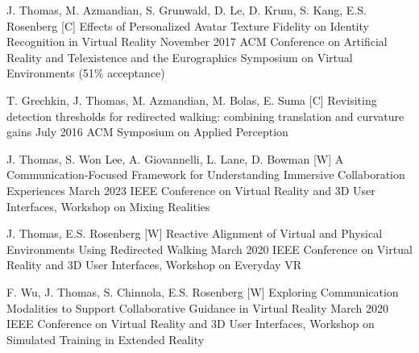 \begin{cvpubs}
  \cvpub
    {J. Thomas, M. Azmandian, S. Grunwald, D. Le, D. Krum, S. Kang, E.S. Rosenberg} %
    {[C\thenpubs] Effects of Personalized Avatar Texture Fidelity on Identity Recognition in Virtual Reality} %
    {November 2017} %
    {ACM Conference on Artificial Reality and Telexistence and the Eurographics Symposium on Virtual Environments (51\% acceptance)} %
    
  \cvpub
    {T. Grechkin, J. Thomas, M. Azmandian, M. Bolas, E. Suma} %
    {[C\thenpubs] Revisiting detection thresholds for redirected walking: combining translation and curvature gains} %
    {July 2016} %
    {ACM Symposium on Applied Perception} %
\end{cvpubs}
   
\setcounter{npubs}{1}
\begin{cvpubs}  
  
  \cvpub
    {J. Thomas, S. Won Lee, A. Giovannelli, L. Lane, D. Bowman} %
    {[W\thenpubs] A Communication-Focused Framework for Understanding Immersive Collaboration Experiences} %
    {March 2023} %
    {IEEE Conference on Virtual Reality and 3D User Interfaces, Workshop on Mixing Realities} %
  
  \cvpub
    {J. Thomas, E.S. Rosenberg} %
    {[W\thenpubs] Reactive Alignment of Virtual and Physical Environments Using Redirected Walking} %
    {March 2020} %
    {IEEE Conference on Virtual Reality and 3D User Interfaces, Workshop on Everyday VR} %
    
  \cvpub
    {F. Wu, J. Thomas, S. Chinnola, E.S. Rosenberg} %
    {[W\thenpubs] Exploring Communication Modalities to Support Collaborative Guidance in Virtual Reality} %
    {March 2020} %
    {IEEE Conference on Virtual Reality and 3D User Interfaces, Workshop on Simulated Training in Extended Reality} %
\end{cvpubs}    
    
